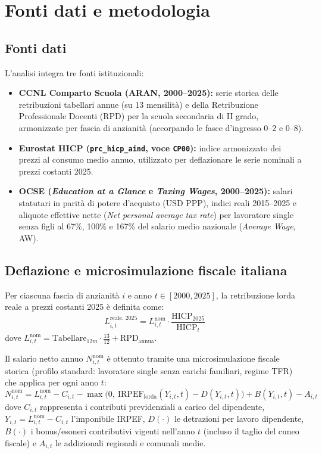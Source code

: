 \documentclass[11pt,a4paper]{article}
\begin{document}
\section{Fonti dati e metodologia}

\subsection{Fonti dati}
L'analisi integra tre fonti istituzionali:
\begin{itemize}
    \item \textbf{CCNL Comparto Scuola (ARAN, 2000--2025):} serie storica delle retribuzioni tabellari annue (su 13 mensilità) e della Retribuzione Professionale Docenti (RPD) per la scuola secondaria di II grado, armonizzate per fascia di anzianità (accorpando le fasce d'ingresso 0--2 e 0--8).
    \item \textbf{Eurostat HICP (\texttt{prc\_hicp\_aind}, voce \texttt{CP00}):} indice armonizzato dei prezzi al consumo medio annuo, utilizzato per deflazionare le serie nominali a prezzi costanti 2025.
    \item \textbf{OCSE (\textit{Education at a Glance} e \textit{Taxing Wages}, 2000--2025):} salari statutari in parità di potere d'acquisto (USD PPP), indici reali 2015--2025 e aliquote effettive nette (\textit{Net personal average tax rate}) per lavoratore single senza figli al 67\%, 100\% e 167\% del salario medio nazionale (\textit{Average Wage}, AW).
\end{itemize}

\subsection{Deflazione e microsimulazione fiscale italiana}
Per ciascuna fascia di anzianità $i$ e anno $t \in [2000, 2025]$, la retribuzione lorda reale a prezzi costanti 2025 è definita come:
\begin{equation}
    L_{i,t}^{\text{reale, 2025}} = L_{i,t}^{\text{nom}} \cdot \frac{\text{HICP}_{2025}}{\text{HICP}_{t}}
\end{equation}
dove $L_{i,t}^{\text{nom}} = \text{Tabellare}_{12m} \cdot \frac{13}{12} + \text{RPD}_{\text{annua}}$.

Il salario netto annuo $N_{i,t}^{\text{nom}}$ è ottenuto tramite una microsimulazione fiscale storica (profilo standard: lavoratore single senza carichi familiari, regime TFR) che applica per ogni anno $t$:
\begin{equation}
    N_{i,t}^{\text{nom}} = L_{i,t}^{\text{nom}} - C_{i,t} - \max\bigl(0,\ \text{IRPEF}_{\text{lorda}}(Y_{i,t}, t) - D(Y_{i,t}, t)\bigr) + B(Y_{i,t}, t) - A_{i,t}
\end{equation}
dove $C_{i,t}$ rappresenta i contributi previdenziali a carico del dipendente, $Y_{i,t} = L_{i,t}^{\text{nom}} - C_{i,t}$ l'imponibile IRPEF, $D(\cdot)$ le detrazioni per lavoro dipendente, $B(\cdot)$ i bonus/esoneri contributivi vigenti nell'anno $t$ (incluso il taglio del cuneo fiscale) e $A_{i,t}$ le addizionali regionali e comunali medie.
\end{document}
